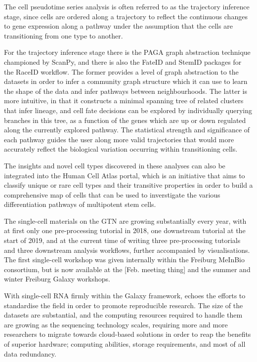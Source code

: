 \documentclass[a4paper,num-refs]{oup-contemporary}
\begin{document}
The cell pseudotime series analysis is often referred to as the trajectory inference stage, since cells are ordered along a trajectory to reflect the continuous changes to gene expression along a pathway under the assumption that the cells are transitioning from one type to another.

For the trajectory inference stage there is the PAGA graph abstraction technique championed by ScanPy, and there is also the FateID and StemID packages for the RaceID workflow. The former provides a level of graph abstraction to the datasets in order to infer a community graph structure which it can use to learn the shape of the data and infer pathways between neighbourhoods. The latter is more intuitive, in that it constructs a minimal spanning tree of related clusters that infer lineage, and cell fate decisions can be explored by individually querying branches in this tree, as a function of the genes which are up or down regulated along the currently explored pathway. The statistical strength and significance of each pathway guides the user along more valid trajectories that would more accurately reflect the biological variation occurring within transitioning cells.

The insights and novel cell types discovered in these analyses can also be integrated into the Human Cell Atlas portal, which is an initiative that aims to classify unique or rare cell types and their transitive properties in order to build a comprehensive map of cells that can be used to inverstigate the various differentiation pathways of multipotent stem cells.

The single-cell materials on the GTN are growing substantially every year, with at first only one pre-processing tutorial in 2018, one downstream tutorial at the start of 2019, and at the current time of writing three pre-processing tutorials and three downstream analysis workflows, further accompanied by visualisations. The first single-cell workshop was given internally within the Freiburg MeInBio consortium, but is now available at the [Feb. meeting thing] and the summer and winter Freiburg Galaxy workshops.

With single-cell RNA firmly within the Galaxy framework, echoes the efforts to standardise the field in order to promote reproducible research. The size of the datasets are substantial, and the computing resources required to handle them are growing as the sequencing technology scales, requiring more and more researchers to migrate towards cloud-based solutions in order to reap the benefits of superior hardware; computing abilities, storage requirements, and most of all data redundancy.
\end{document}

